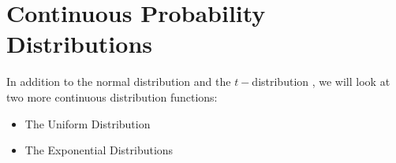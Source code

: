 \newpage


\section{Continuous Probability Distributions}

In addition to the normal distribution and the $t-$distribution , we will look at two more continuous distribution functions: 
\begin{itemize}

\item The Uniform Distribution

\item The Exponential Distributions
\end{itemize}

